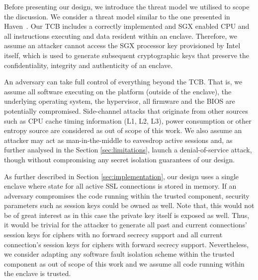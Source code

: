 \documentclass[../main.tex]{subfiles}
\begin{document}
Before presenting our design, we introduce the threat model we
utilised to scope the discussion. We consider a threat model similar
to the one presented in Haven~\cite{Baumann14}. Our TCB includes a
correctly implemented and SGX enabled CPU and all instructions
executing and data resident within an enclave. Therefore, we assume an
attacker cannot access the SGX processor key provisioned by Intel
itself, which is used to generate subsequent cryptographic keys that
preserve the confidentiality, integrity and authenticity of an
enclave.

An adversary can take full control of everything beyond the TCB. That
is, we assume all software executing on the platform (outside of the
enclave), the underlying operating system, the hypervisor, all
firmware and the BIOS are potentially compromised. Side-channel
attacks that originate from other sources such as CPU cache timing
information (L1, L2, L3), power consumption or other entropy source
are considered as out of scope of this work. We also assume an
attacker may act as man-in-the-middle to eavesdrop active sessions
and, as further analysed in the Section \ref{sec:limitations}, launch
a denial-of-service attack, though without compromising any secret
isolation guarantees of our design.

As further described in Section \ref{sec:implementation}, our design
uses a single enclave where state for all active SSL connections is
stored in memory. If an adversary compromises the code running within
the trusted component, security parameters such as session keys could
be owned as well. Note that, this would not be of great interest as
in this case the private key itself is exposed as well. Thus, it
would be trivial for the attacker to generate all past and current
connections' session keys for ciphers with no forward secrecy support
and all current connection's session keys for ciphers with forward
secrecy support. Nevertheless, we consider adapting any software
fault isolation scheme within the trusted component as out of scope
of this work and we assume all code running within the enclave is
trusted.
\end{document}
